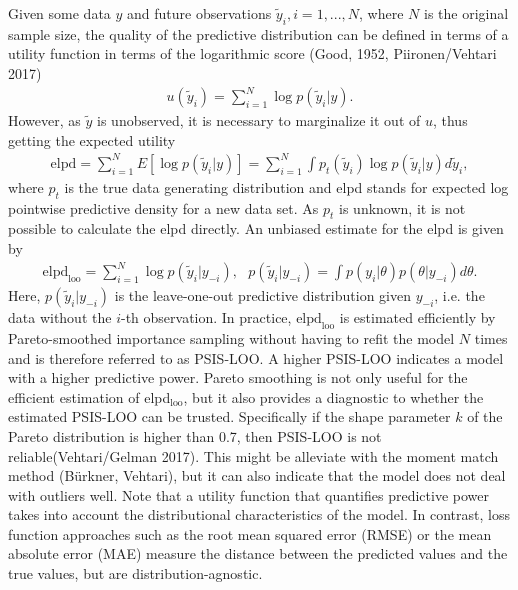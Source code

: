 Given some data $y$ and future observations $\tilde y_i, i = 1, ..., N$, where $N$ is the original sample size, the quality of the predictive distribution can be defined in terms of a utility function in terms of the logarithmic score (Good, 1952, Piironen/Vehtari 2017)
\begin{gather*}
    u(\tilde y_i) = \displaystyle \sum_{i = 1}^N\log p(\tilde y_i|y).
\end{gather*}
However, as $\tilde y$ is unobserved, it is necessary to marginalize it out of $u$, thus getting the expected utility
\begin{gather*}
    \text{elpd} =
    \displaystyle \sum_{i = 1}^N E[\log p(\tilde y_i| y)] =
    \displaystyle \sum_{i = 1}^N \int p_t(\tilde y_i) \log p(\tilde y_i| y) d \tilde y_i,
\end{gather*}
where $p_t$ is the true data generating distribution and elpd stands for expected log pointwise predictive density for a new data set.
As $p_t$ is unknown, it is not possible to calculate the elpd directly.
An unbiased estimate for the elpd is given by
\begin{gather}
    \text{elpd}_{\text{loo}} =
    \displaystyle \sum_{i = 1}^N \log p(\tilde y_i| y_{-i}),
    ~~~ p(\tilde y_i| y_{-i}) = \displaystyle \int p(y_i | \theta)p(\theta|y_{-i})d\theta.
\end{gather}
Here, $p(\tilde y_i| y_{-i})$ is the leave-one-out predictive distribution given $y_{-i}$, i.e. the data without the $i$-th observation.
In practice, $\text{elpd}_{\text{loo}}$ is estimated efficiently by Pareto-smoothed importance sampling without having to refit the model $N$ times and is therefore referred to as PSIS-LOO.
A higher PSIS-LOO indicates a model with a higher predictive power.
Pareto smoothing is not only useful for the efficient estimation of elpd$_{\text{loo}}$, but it also provides a diagnostic to whether the estimated PSIS-LOO can be trusted.
Specifically if the shape parameter $k$ of the Pareto distribution is higher than 0.7, then PSIS-LOO is not reliable(Vehtari/Gelman 2017).
This might be alleviate with the moment match method (Bürkner, Vehtari), but it can also indicate that the model does not deal with outliers well.
Note that a utility function that quantifies predictive power takes into account the distributional characteristics of the model.
In contrast, loss function approaches such as the root mean squared error (RMSE) or the mean absolute error (MAE) measure the distance between the predicted values and the true values, but are distribution-agnostic.


